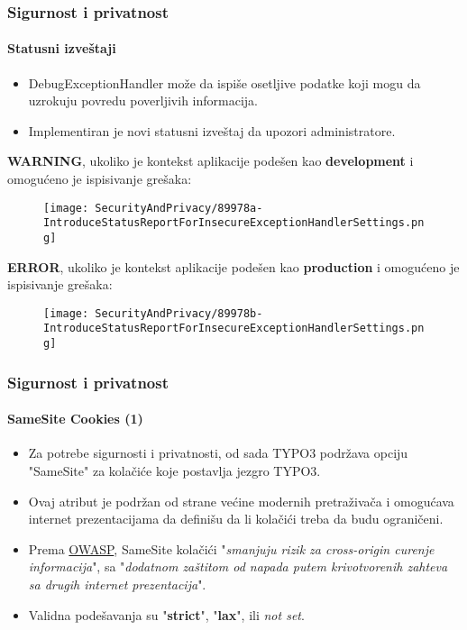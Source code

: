 \begin{frame}[fragile]
	\frametitle{Sigurnost i privatnost}
	\framesubtitle{Statusni izveštaji}

	\begin{itemize}
		\item DebugExceptionHandler može da ispiše osetljive podatke koji mogu da
		 	uzrokuju povredu poverljivih informacija.
		\item Implementiran je novi statusni izveštaj da upozori administratore.
	\end{itemize}

	\vspace{0.4cm}
	\textbf{WARNING}, ukoliko je kontekst aplikacije podešen kao \textbf{development} i omogućeno je ispisivanje grešaka:
	\begin{figure}
		\texttt{[image: SecurityAndPrivacy/89978a-IntroduceStatusReportForInsecureExceptionHandlerSettings.png]}
	\end{figure}

	\textbf{ERROR}, ukoliko je kontekst aplikacije podešen kao \textbf{production} i omogućeno je ispisivanje grešaka:
	\begin{figure}
		\texttt{[image: SecurityAndPrivacy/89978b-IntroduceStatusReportForInsecureExceptionHandlerSettings.png]}
	\end{figure}

\end{frame}


\begin{frame}[fragile]
	\frametitle{Sigurnost i privatnost}
	\framesubtitle{SameSite Cookies (1)}

	\begin{itemize}
		\item Za potrebe sigurnosti i privatnosti, od sada TYPO3 podržava opciju "SameSite"
			za kolačiće koje postavlja jezgro TYPO3.
		\item Ovaj atribut je podržan od strane većine modernih pretraživača i omogućava internet prezentacijama
			da definišu da li kolačići treba da budu ograničeni.
		\item Prema
			\href{https://www.owasp.org/index.php/SameSite}{OWASP}, SameSite kolačići\newline
			\small
				"\textit{smanjuju rizik za cross-origin curenje informacija}", sa\newline
				"\textit{dodatnom zaštitom od napada putem krivotvorenih zahteva sa drugih internet prezentacija}".
			\normalsize

		\item Validna podešavanja su "\textbf{strict}", "\textbf{lax}", ili \textit{not set}.
	\end{itemize}

\end{frame}

